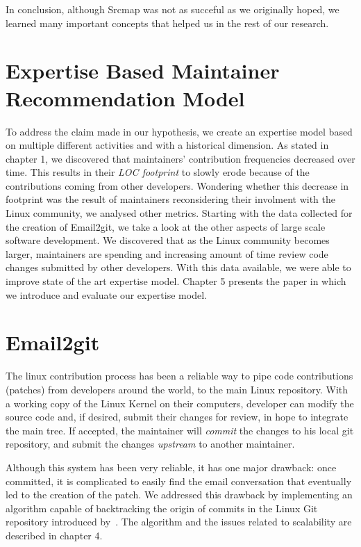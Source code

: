 In conclusion, although Srcmap was not as succeful as we originally hoped, we learned many important concepts that helped us in the rest of our research. 


\section{Expertise Based Maintainer Recommendation Model}
\label{sec:expertise_model}

To address the claim made in our hypothesis, we create an expertise model based on multiple different activities and with a historical dimension. As stated in chapter 1, we discovered that maintainers' contribution frequencies decreased over time. This results in their \textit{LOC footprint} to slowly erode because of the contributions coming from other developers. Wondering whether this decrease in footprint was the result of maintainers reconsidering their involment with the Linux community, we analysed other metrics. Starting with the data collected for the creation of Email2git, we take a look at the other aspects of large scale software development. We discovered that as the Linux community becomes larger, maintainers are spending and increasing amount of time review code changes submitted by other developers. With this data available, we were able to improve state of the art expertise model. Chapter 5 presents the paper in which we introduce and evaluate our expertise model. 






\section{Email2git}
\label{sec:email2git}

The linux contribution process has been a reliable way to pipe code contributions (patches) from developers around the world, to the main Linux repository. With a working copy of the Linux Kernel on their computers, developer can modify the source code and, if desired, submit their changes for review, in hope to integrate the main tree. If accepted, the maintainer will \textit{commit} the changes to his local git repository, and submit the changes \textit{upstream} to another maintainer. 

Although this system has been very reliable, it has one major drawback: once committed, it is complicated to easily find the email conversation that eventually led to the creation of the patch. We addressed this drawback by implementing an algorithm capable of backtracking the origin of commits in the Linux Git repository introduced by~\citep{jiang14}. The algorithm and the issues related to scalability are described in chapter 4.

